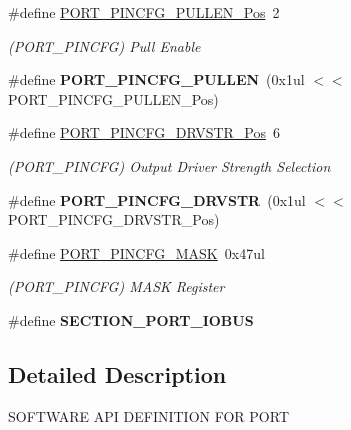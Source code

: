 \begin{DoxyCompactItemize}
\item 
\hypertarget{group___s_a_m_l21___p_o_r_t_ga686c2d965f888e1538721fee55c89fb5}{}\#define \hyperlink{group___s_a_m_l21___p_o_r_t_ga686c2d965f888e1538721fee55c89fb5}{P\+O\+R\+T\+\_\+\+P\+I\+N\+C\+F\+G\+\_\+\+P\+U\+L\+L\+E\+N\+\_\+\+Pos}~2\label{group___s_a_m_l21___p_o_r_t_ga686c2d965f888e1538721fee55c89fb5}

\begin{DoxyCompactList}\small\item\em (P\+O\+R\+T\+\_\+\+P\+I\+N\+C\+F\+G) Pull Enable \end{DoxyCompactList}\item 
\hypertarget{group___s_a_m_l21___p_o_r_t_ga9b0b89d777ef1d50467b1db310d9f9ab}{}\#define {\bfseries P\+O\+R\+T\+\_\+\+P\+I\+N\+C\+F\+G\+\_\+\+P\+U\+L\+L\+E\+N}~(0x1ul $<$$<$ P\+O\+R\+T\+\_\+\+P\+I\+N\+C\+F\+G\+\_\+\+P\+U\+L\+L\+E\+N\+\_\+\+Pos)\label{group___s_a_m_l21___p_o_r_t_ga9b0b89d777ef1d50467b1db310d9f9ab}

\item 
\hypertarget{group___s_a_m_l21___p_o_r_t_ga42ef9392a67cfdc9f6d712f9d758f379}{}\#define \hyperlink{group___s_a_m_l21___p_o_r_t_ga42ef9392a67cfdc9f6d712f9d758f379}{P\+O\+R\+T\+\_\+\+P\+I\+N\+C\+F\+G\+\_\+\+D\+R\+V\+S\+T\+R\+\_\+\+Pos}~6\label{group___s_a_m_l21___p_o_r_t_ga42ef9392a67cfdc9f6d712f9d758f379}

\begin{DoxyCompactList}\small\item\em (P\+O\+R\+T\+\_\+\+P\+I\+N\+C\+F\+G) Output Driver Strength Selection \end{DoxyCompactList}\item 
\hypertarget{group___s_a_m_l21___p_o_r_t_gac288754ea6b7640bc385b595c4c41849}{}\#define {\bfseries P\+O\+R\+T\+\_\+\+P\+I\+N\+C\+F\+G\+\_\+\+D\+R\+V\+S\+T\+R}~(0x1ul $<$$<$ P\+O\+R\+T\+\_\+\+P\+I\+N\+C\+F\+G\+\_\+\+D\+R\+V\+S\+T\+R\+\_\+\+Pos)\label{group___s_a_m_l21___p_o_r_t_gac288754ea6b7640bc385b595c4c41849}

\item 
\hypertarget{group___s_a_m_l21___p_o_r_t_ga6e82d11b9330c18aa786f4f4693fa55c}{}\#define \hyperlink{group___s_a_m_l21___p_o_r_t_ga6e82d11b9330c18aa786f4f4693fa55c}{P\+O\+R\+T\+\_\+\+P\+I\+N\+C\+F\+G\+\_\+\+M\+A\+S\+K}~0x47ul\label{group___s_a_m_l21___p_o_r_t_ga6e82d11b9330c18aa786f4f4693fa55c}

\begin{DoxyCompactList}\small\item\em (P\+O\+R\+T\+\_\+\+P\+I\+N\+C\+F\+G) M\+A\+S\+K Register \end{DoxyCompactList}\item 
\hypertarget{group___s_a_m_l21___p_o_r_t_gabfc09a7404725e7ebeb326667765d00c}{}\#define {\bfseries S\+E\+C\+T\+I\+O\+N\+\_\+\+P\+O\+R\+T\+\_\+\+I\+O\+B\+U\+S}\label{group___s_a_m_l21___p_o_r_t_gabfc09a7404725e7ebeb326667765d00c}

\end{DoxyCompactItemize}


\subsection{Detailed Description}
S\+O\+F\+T\+W\+A\+R\+E A\+P\+I D\+E\+F\+I\+N\+I\+T\+I\+O\+N F\+O\+R P\+O\+R\+T 